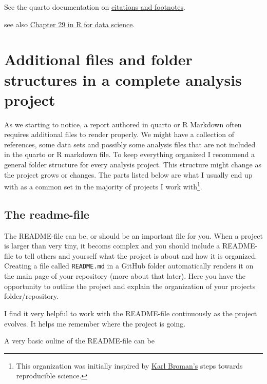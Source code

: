 \documentclass[
  11pt,
  letterpaper,
]{scrbook}
\begin{document}
See the quarto documentation on
\href{https://quarto.org/docs/authoring/footnotes-and-citations.html}{citations
and footnotes}.

see also \href{https://r4ds.hadley.nz/quarto.html}{Chapter 29 in R for
data science}.

\hypertarget{additional-files-and-folder-structures-in-a-complete-analysis-project}{%
\section{Additional files and folder structures in a complete analysis
project}\label{additional-files-and-folder-structures-in-a-complete-analysis-project}}

As we starting to notice, a report authored in quarto or R Markdown
often requires additional files to render properly. We might have a
collection of references, some data sets and possibly some analysis
files that are not included in the quarto or R markdown file. To keep
everything organized I recommend a general folder structure for every
analysis project. This structure might change as the project grows or
changes. The parts listed below are what I usually end up with as a
common set in the majority of projects I work with\footnote{This
  organization was initially inspired by
  \href{https://kbroman.org/steps2rr/pages/organize.html}{Karl Broman's}
  steps towards reproducible science.}.

\hypertarget{the-readme-file}{%
\subsection{The readme-file}\label{the-readme-file}}

The README-file can be, or should be an important file for you. When a
project is larger than very tiny, it becoms complex and you should
include a README-file to tell others and yourself what the project is
about and how it is organized. Creating a file called \texttt{README.md}
in a GitHub folder automatically renders it on the main page of your
repository (more about that later). Here you have the opportunity to
outline the project and explain the organization of your projects
folder/repository.

I find it very helpful to work with the README-file continuously as the
project evolves. It helps me remember where the project is going.

A very basic ouline of the README-file can be
\end{document}
